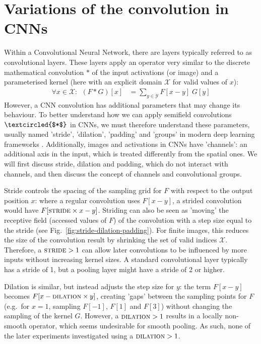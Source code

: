 \documentclass[a4paper, 12pt]{report}
\begin{document}
\section{Variations of the convolution in CNNs}
Within a Convolutional Neural Network, there are layers typically referred to as convolutional layers. These layers apply an operator very similar to the discrete mathematical convolution $*$ of the input activations (or image) and a parameterised kernel (here with an explicit domain $\mathcal{X}$ for valid values of $x$):
\begin{align}
\forall x\in\mathcal{X}:~~(F*G)[x] &= \sum_{y\in\mathcal{Y}} F[x-y]\; G[y]
\end{align}
However, a CNN convolution has additional parameters that may change its behaviour. To better understand how we can apply semifield convolutions $\textcircled{$*$}$ in CNNs, we must therefore understand these parameters, usually named 'stride', 'dilation', 'padding'  and 'groups' in modern deep learning frameworks \cite{noauthor_conv2d_nodate, noauthor_xla_nodate}. Additionally, images and activations in CNNs have 'channels': an additional axis in the input, which is treated differently from the spatial ones. We will first discuss stride, dilation and padding, which do not interact with channels, and then discuss the concept of channels and convolutional groups.

Stride controls the spacing of the sampling grid for $F$ with respect to the output position $x$: where a regular convolution uses $F[x-y]$, a strided convolution would have $F[\textsc{stride}\times x - y]$. Striding can also be seen as 'moving' the receptive field (accessed values of $F$) of the convolution with a step size equal to the stride (see Fig.\ \ref{fig:stride-dilation-padding}). For finite images, this reduces the size of the convolution result by shrinking the set of valid indices $\mathcal{X}$. Therefore, a $\textsc{stride}>1$ can allow later convolutions to be influenced by more inputs without increasing kernel sizes. A standard convolutional layer typically has a stride of 1, but a pooling layer might have a stride of 2 or higher.

Dilation is similar, but instead adjusts the step size for $y$: the term $F[x-y]$ becomes $F[x-\textsc{dilation}\times y]$, creating 'gaps' between the sampling points for $F$ (e.g.\ for $x=1$, sampling $F[-1]$, $F[1]$ and $F[3]$) without changing the sampling of the kernel $G$. However, a $\textsc{dilation}>1$ results in a locally non-smooth operator, which seems undesirable for smooth pooling. As such, none of the later experiments investigated using a $\textsc{dilation}>1$.
\end{document}
